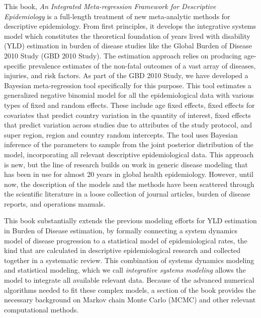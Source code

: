 This book, \emph{An Integrated Meta-regression Framework for Descriptive
  Epidemiology} is a full-length treatment of new meta-analytic
methods for descriptive epidemiology.  From first principles, it
develops the integrative systems model which constitutes the
theoretical foundation of years lived with disability (YLD) estimation
in burden of disease studies like the Global Burden of Disease 2010
Study (GBD 2010 Study).  The estimation approach relies on producing
age-specific prevalence estimates of the non-fatal outcomes of a vast
array of diseases, injuries, and risk factors.  As part of the GBD
2010 Study, we have developed a Bayesian meta-regression tool
specifically for this purpose. This tool estimates a generalized
negative binomial model for all the epidemiological data with various
types of fixed and random effects.  These include age fixed effects,
fixed effects for covariates that predict country variation in the
quantity of interest, fixed effects that predict variation across
studies due to attributes of the study protocol, and super region,
region and country random intercepts.  The tool uses Bayesian
inference of the parameters to sample from the joint posterior
distribution of the model, incorporating all relevant descriptive
epidemiological data.  This approach is new, but the line of research
builds on work in generic disease modeling that has been in use for
almost 20 years in global health
epidemiology.\cite{Barendregt_Generic_2003} However, until now, the
description of the models and the methods have been scattered through
the scientific literature in a loose collection of journal articles,
burden of disease reports, and operations manuals.

This book substantially extends the previous modeling efforts for YLD estimation
in Burden of Disease estimation, by formally connecting a system dynamics model of disease
progression to a statistical model of epidemiological rates, the kind
that are calculated in descriptive epidemiological research and
collected together in a systematic review.  This combination of
systems dynamics modeling and statistical modeling, which we call
\emph{integrative systems modeling} allows the model to integrate all
available relevant data.  Because of the advanced numerical algorithms needed to fit these complex models, a section of the book provides the
necessary background on Markov chain Monte Carlo (MCMC) and other
relevant computational methods.

